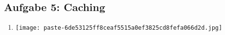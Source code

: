 \documentclass[12pt,a4paper]{article}
\begin{document}
\subsection*{Aufgabe 5: Caching}

\begin{enumerate}[label=\alph*), topsep=5pt, itemsep=10pt]
\item \mbox{}\begin{center}\texttt{[image: paste-6de53125ff8ceaf5515a0ef3825cd8fefa066d2d.jpg]}
\end{center}
\end{enumerate}
\clearpage
\end{document}
